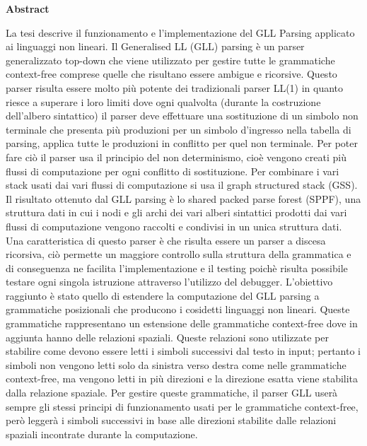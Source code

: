 \documentclass[12pt]{article}
\begin{document}
	\begin{center}
		{\huge\bf Abstract}\par
	\end{center}
	La tesi descrive il funzionamento e l'implementazione del GLL Parsing applicato ai linguaggi non lineari. Il Generalised LL (GLL) parsing è un parser generalizzato top-down che viene utilizzato per gestire tutte le grammatiche context-free comprese quelle che risultano essere ambigue e ricorsive. Questo parser risulta essere molto più potente dei tradizionali parser LL(1) in quanto riesce a superare i loro limiti dove ogni qualvolta (durante la costruzione dell'albero sintattico) il parser deve effettuare una sostituzione di un simbolo non terminale  che presenta più produzioni per un simbolo d'ingresso nella tabella di parsing, applica tutte le produzioni in conflitto per quel non terminale. Per poter fare ciò il parser usa il principio del non determinismo, cioè vengono creati più flussi di computazione per ogni conflitto di sostituzione. Per combinare i vari stack usati dai vari flussi di computazione si usa il graph structured stack (GSS). Il risultato ottenuto dal GLL parsing è lo shared packed parse forest (SPPF), una struttura dati in cui i nodi e gli archi dei vari alberi sintattici prodotti dai vari flussi di computazione vengono raccolti e condivisi in un unica struttura dati. Una caratteristica di questo parser è che risulta essere un parser a discesa ricorsiva, ciò permette un maggiore controllo sulla struttura della grammatica e di conseguenza ne facilita l'implementazione e il testing poichè risulta possibile testare ogni singola istruzione attraverso l'utilizzo del debugger. L'obiettivo raggiunto è stato quello di estendere la computazione del GLL parsing a grammatiche posizionali che producono i cosidetti linguaggi non lineari. Queste grammatiche rappresentano un estensione delle grammatiche context-free dove in aggiunta hanno delle relazioni spaziali. Queste relazioni sono utilizzate per stabilire come devono essere letti i simboli successivi dal testo in input; pertanto i simboli non vengono letti solo da sinistra verso destra come nelle grammatiche context-free, ma vengono letti in più direzioni e la direzione esatta viene stabilita dalla relazione spaziale. Per gestire queste grammatiche, il parser GLL userà sempre gli stessi principi di funzionamento usati per le grammatiche context-free, però leggerà i simboli successivi in base alle direzioni stabilite dalle relazioni spaziali incontrate durante la computazione.
\end{document}
